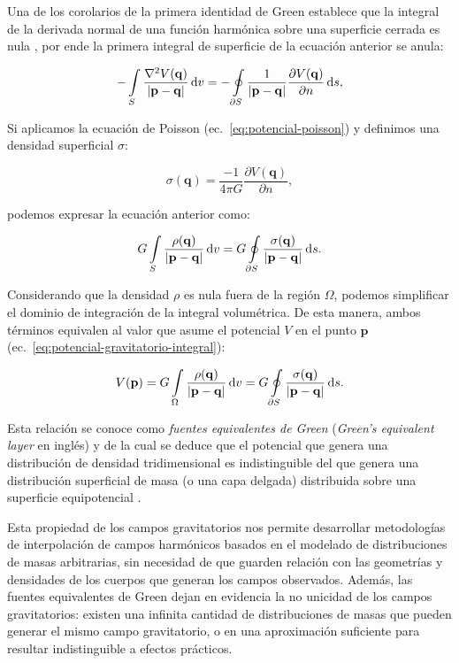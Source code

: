 Una de los corolarios de la primera identidad de Green establece que la
integral de la derivada normal de una función harmónica  sobre una superficie
cerrada es nula \citep[][p.~20]{blakely1995}, por ende la primera integral de
superficie de la ecuación anterior se anula:

\begin{equation}
    - \int\limits_S
        \frac{\nabla^2 V(\mathbf{q})}{|\mathbf{p} - \mathbf{q}|}
    \mathop{}\!\textnormal{d} v
    =
    - \oint\limits_{\partial S}
        \frac{1}{|\mathbf{p} - \mathbf{q}|}
        \frac{\partial V(\mathbf{q})}{\partial n}
    \mathop{}\!\textnormal{d} s,
\end{equation}

Si aplicamos la ecuación de Poisson (ec.~\ref{eq:potencial-poisson})
y definimos una densidad superficial $\sigma$:

\begin{equation}
    \sigma(\mathbf{q}) =
    \frac{-1}{4\pi G} \frac{\partial V(\mathbf{q})}{\partial n},
\end{equation}

\noindent podemos expresar la ecuación anterior como:

\begin{equation}
    G \int\limits_S
        \frac{\rho(\mathbf{q})}{|\mathbf{p} - \mathbf{q}|}
    \mathop{}\!\textnormal{d} v
    =
    G \oint\limits_{\partial S}
        \frac{\sigma(\mathbf{q})}{|\mathbf{p} - \mathbf{q}|}
    \mathop{}\!\textnormal{d} s.
\end{equation}

Considerando que la densidad $\rho$ es nula fuera de la región $\Omega$,
podemos simplificar el dominio de integración de la integral volumétrica.
De esta manera, ambos términos equivalen al valor que asume el potencial $V$ en
el punto $\mathbf{p}$ (ec.~\ref{eq:potencial-gravitatorio-integral}):

\begin{equation}
    V(\mathbf{p}) =
    G \int\limits_\Omega
        \frac{\rho(\mathbf{q})}{|\mathbf{p} - \mathbf{q}|}
    \mathop{}\!\textnormal{d} v
    =
    G \oint\limits_{\partial S}
        \frac{\sigma(\mathbf{q})}{|\mathbf{p} - \mathbf{q}|}
    \mathop{}\!\textnormal{d} s.
\end{equation}

Esta relación se conoce como \emph{fuentes equivalentes de Green}
(\emph{Green's equivalent layer} en inglés) y de la cual se deduce que el
potencial que genera una distribución de densidad tridimensional es
indistinguible del que genera una distribución superficial de masa (o una capa
delgada) distribuida sobre una superficie equipotencial
\citep[][p.~62]{blakely1995}.

Esta propiedad de los campos gravitatorios nos permite desarrollar metodologías
de interpolación de campos harmónicos basados en el modelado de distribuciones
de masas arbitrarias, sin necesidad de que guarden relación con las geometrías
y densidades de los cuerpos que generan los campos observados.
Además, las fuentes equivalentes de Green dejan en evidencia la no unicidad de
los campos gravitatorios: existen una infinita cantidad de distribuciones de
masas que pueden generar el mismo campo gravitatorio, o en una aproximación
suficiente para resultar indistinguible a efectos prácticos.
